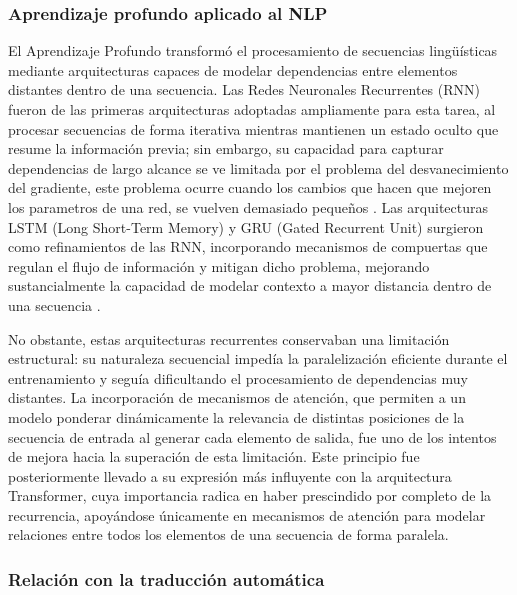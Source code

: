 \subsubsection{Aprendizaje profundo aplicado al NLP}
El Aprendizaje Profundo transformó el procesamiento de secuencias lingüísticas mediante arquitecturas capaces de modelar dependencias entre elementos distantes dentro de una secuencia. Las Redes Neuronales Recurrentes (RNN) fueron de las primeras arquitecturas adoptadas ampliamente para esta tarea, al procesar secuencias de forma iterativa mientras mantienen un estado oculto que resume la información previa; sin embargo, su capacidad para capturar dependencias de largo alcance se ve limitada por el problema del desvanecimiento del gradiente, este problema ocurre cuando los cambios que hacen que mejoren los parametros de una red, se vuelven demasiado pequeños \cite{ultralytics2026vanishing}. Las arquitecturas LSTM (Long Short-Term Memory) y GRU (Gated Recurrent Unit) surgieron como refinamientos de las RNN, incorporando mecanismos de compuertas que regulan el flujo de información y mitigan dicho problema, mejorando sustancialmente la capacidad de modelar contexto a mayor distancia dentro de una secuencia \cite{young2018recent}.

No obstante, estas arquitecturas recurrentes conservaban una limitación estructural: su naturaleza secuencial impedía la paralelización eficiente durante el entrenamiento y seguía dificultando el procesamiento de dependencias muy distantes. La incorporación de mecanismos de atención, que permiten a un modelo ponderar dinámicamente la relevancia de distintas posiciones de la secuencia de entrada al generar cada elemento de salida, fue uno de los intentos de mejora hacia la superación de esta limitación. Este principio fue posteriormente llevado a su expresión más influyente con la arquitectura Transformer, cuya importancia radica en haber prescindido por completo de la recurrencia, apoyándose únicamente en mecanismos de atención para modelar relaciones entre todos los elementos de una secuencia de forma paralela.

\subsubsection{Relación con la traducción automática}

